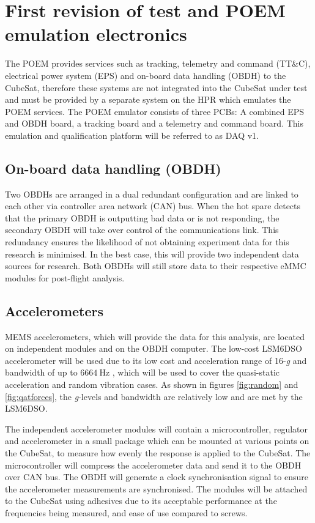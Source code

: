\documentclass[a4paper,11pt]{article}
\begin{document}
\section{First revision of test and POEM emulation electronics}

The POEM provides services such as tracking, telemetry and command (TT\&C), electrical power system (EPS) and on-board data handling (OBDH) to the CubeSat, therefore these systems are not integrated into the CubeSat under test and must be provided by a separate system on the HPR which emulates the POEM services. The POEM emulator consists of three PCBs: A combined EPS and OBDH board, a tracking board and a telemetry and command board. This emulation and qualification platform will be referred to as DAQ v1.

\subsection{On-board data handling (OBDH)}
Two OBDHs are arranged in a dual redundant configuration and are linked to each other via controller area network (CAN) bus. When the hot spare detects that the primary OBDH is outputting bad data or is not responding, the secondary OBDH will take over control of the communications link. This redundancy ensures the likelihood of not obtaining experiment data for this research is minimised. In the best case, this will provide two independent data sources for research. Both OBDHs will still store data to their respective eMMC modules for post-flight analysis.

\subsection{Accelerometers}
MEMS accelerometers, which will provide the data for this analysis, are located on independent modules and on the OBDH computer. The low-cost LSM6DSO accelerometer will be used due to its low cost and acceleration range of 16-\textit{g} and bandwidth of up to $\SI{6664}{\hertz}$ \cite{lsm6dso-datasheet}, which will be used to cover the quasi-static acceleration and random vibration cases. As shown in figures \ref{fig:random} and \ref{fig:qatforces}, the \textit{g}-levels and bandwidth are relatively low and are met by the LSM6DSO.

The independent accelerometer modules will contain a microcontroller, regulator and accelerometer in a small package which can be mounted at various points on the CubeSat, to measure how evenly the response is applied to the CubeSat. The microcontroller will compress the accelerometer data and send it to the OBDH over CAN bus. The OBDH will generate a clock synchronisation signal to ensure the accelerometer measurements are synchronised. The modules will be attached to the CubeSat using adhesives due to its acceptable performance at the frequencies being measured, and ease of use compared to screws.
\end{document}
